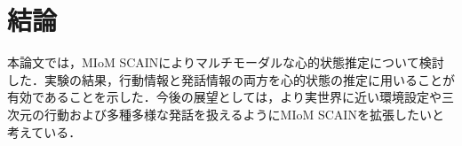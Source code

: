\chapter{結論}
本論文では，MIoM SCAINによりマルチモーダルな心的状態推定について検討した．実験の結果，行動情報と発話情報の両方を心的状態の推定に用いることが有効であることを示した．今後の展望としては，より実世界に近い環境設定や三次元の行動および多種多様な発話を扱えるようにMIoM SCAINを拡張したいと考えている．
